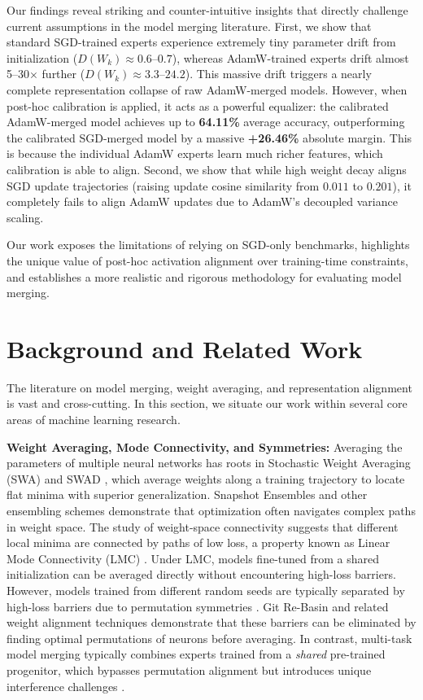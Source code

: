 \documentclass{article}
\theoremstyle{plain}
\theoremstyle{definition}
\theoremstyle{remark}
\begin{document}
Our findings reveal striking and counter-intuitive insights that directly challenge current assumptions in the model merging literature. First, we show that standard SGD-trained experts experience extremely tiny parameter drift from initialization ($D(W_k) \approx 0.6$--$0.7$), whereas AdamW-trained experts drift almost 5--30$\times$ further ($D(W_k) \approx 3.3$--$24.2$). This massive drift triggers a nearly complete representation collapse of raw AdamW-merged models. However, when post-hoc calibration is applied, it acts as a powerful equalizer: the calibrated AdamW-merged model achieves up to \textbf{64.11\%} average accuracy, outperforming the calibrated SGD-merged model by a massive \textbf{+26.46\%} absolute margin. This is because the individual AdamW experts learn much richer features, which calibration is able to align. Second, we show that while high weight decay aligns SGD update trajectories (raising update cosine similarity from $0.011$ to $0.201$), it completely fails to align AdamW updates due to AdamW's decoupled variance scaling. 

Our work exposes the limitations of relying on SGD-only benchmarks, highlights the unique value of post-hoc activation alignment over training-time constraints, and establishes a more realistic and rigorous methodology for evaluating model merging.

\section{Background and Related Work}
\label{sec:related}

The literature on model merging, weight averaging, and representation alignment is vast and cross-cutting. In this section, we situate our work within several core areas of machine learning research.

\textbf{Weight Averaging, Mode Connectivity, and Symmetries:} Averaging the parameters of multiple neural networks has roots in Stochastic Weight Averaging (SWA) \cite{izmailov2018averaging} and SWAD \cite{cha2022swad}, which average weights along a training trajectory to locate flat minima with superior generalization. Snapshot Ensembles \cite{huang2017snapshot} and other ensembling schemes \cite{garipov2018loss} demonstrate that optimization often navigates complex paths in weight space. The study of weight-space connectivity suggests that different local minima are connected by paths of low loss, a property known as Linear Mode Connectivity (LMC) \cite{frankle2020linear}. Under LMC, models fine-tuned from a shared initialization can be averaged directly without encountering high-loss barriers. However, models trained from different random seeds are typically separated by high-loss barriers due to permutation symmetries \cite{ainsworth2022git}. Git Re-Basin \cite{ainsworth2022git} and related weight alignment techniques \cite{detry2024fedmerge} demonstrate that these barriers can be eliminated by finding optimal permutations of neurons before averaging. In contrast, multi-task model merging typically combines experts trained from a \textit{shared} pre-trained progenitor, which bypasses permutation alignment but introduces unique interference challenges \cite{yang2024model, yang2025from}.
\end{document}
